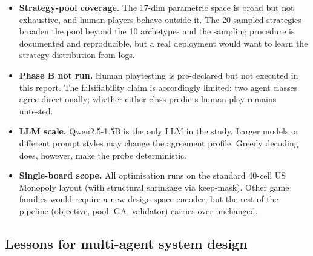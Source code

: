 \documentclass[10pt]{article}
\begin{document}
\begin{itemize}[leftmargin=1.2em,itemsep=1pt]
\item \textbf{Strategy-pool coverage.} The 17-dim parametric space is
broad but not exhaustive, and human players behave outside it. The 20
sampled strategies broaden the pool beyond the 10 archetypes and the
sampling procedure is documented and reproducible, but a real
deployment would want to learn the strategy distribution from logs.
\item \textbf{Phase B not run.} Human playtesting is pre-declared but
not executed in this report. The falsifiability claim is accordingly
limited: two agent classes agree directionally; whether either class
predicts human play remains untested.
\item \textbf{LLM scale.} Qwen2.5-1.5B is the only LLM in the study.
Larger models or different prompt styles may change the agreement
profile. Greedy decoding does, however, make the probe deterministic.
\item \textbf{Single-board scope.} All optimisation runs on the
standard 40-cell US Monopoly layout (with structural shrinkage via
keep-mask). Other game families would require a new design-space
encoder, but the rest of the pipeline (objective, pool, GA,
validator) carries over unchanged.
\end{itemize}

\subsection{Lessons for multi-agent system design}\label{sec:lessons}
\end{document}
